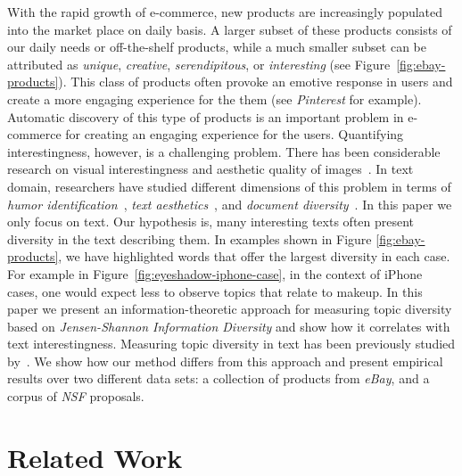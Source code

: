 \documentclass{article}
\begin{document}
With the rapid growth of e-commerce, new products are increasingly populated into the market place on daily basis.  A larger subset of these products consists of our daily needs or off-the-shelf products, while a much smaller subset can be attributed as {\em unique}, {\em creative}, {\em serendipitous}, or {\em interesting} (see Figure~\ref{fig:ebay-products}). This class of products often provoke an emotive response in users and create a more engaging experience for the them (see  {\em Pinterest} for example). Automatic discovery of this type of products is an important problem in e-commerce for creating an engaging experience for the users.   Quantifying interestingness, however,  is a challenging problem. There has been considerable research on visual interestingness and aesthetic quality of images~\cite{Datta:2006:SAP:2129560.2129588,Ke:2006:DHF:1153170.1153495,IsolaParikhTorralbaOliva2011,dhar:2011,reinecke2013predicting,journals/pami/WeinshallZHKOABGNPHP12}. 
In text domain, researchers have studied different dimensions of this
problem in terms of {\em humor
  identification}~\cite{Mihalcea:2005:MCL:1220575.1220642,Davidov:2010:SRS:1870568.1870582,Kiddon11,labutov-lipson:2012:ACL2012short},
{\em text
  aesthetics}~\cite{journals:tamd:Schmidhuber10,N13-1118,ganguly:2014},
and {\em document diversity}~\cite{bache:2013}.  In this paper we only
focus on text. Our hypothesis is, many interesting texts often
present diversity in the text describing them. In examples shown in Figure \ref{fig:ebay-products}, we have highlighted words that offer the largest diversity in each case.
For example in Figure~\ref{fig:eyeshadow-iphone-case}, in the context of iPhone cases, one would expect less to observe topics that relate to makeup. In this paper we present an information-theoretic approach for measuring topic diversity based on {\em Jensen-Shannon Information Diversity} and show how it correlates with text interestingness. Measuring topic diversity in text has been previously studied by~\cite{bache:2013}. We show how our method differs from this approach and present empirical results over two different data sets: a collection of products from {\sl eBay}, and a corpus of {\sl NSF} proposals. 


\section{Related Work}
\label{sec:related-work}
\end{document}
